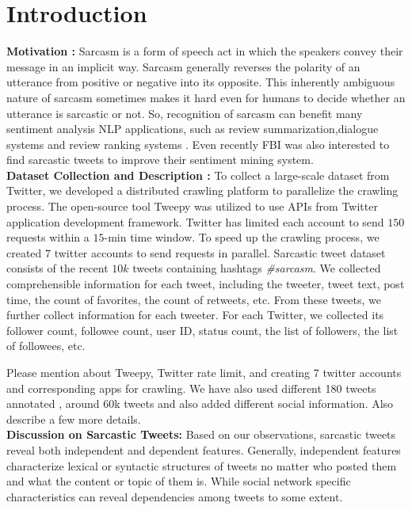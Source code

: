 \section{Introduction}

\noindent \textbf{Motivation :} Sarcasm is a form of speech act in which the speakers convey their message in an
implicit way. Sarcasm generally reverses the polarity of an utterance from positive or negative into its opposite. This inherently ambiguous nature of sarcasm sometimes makes it hard even for humans to decide whether an utterance is sarcastic or not. So, recognition of sarcasm can benefit many sentiment analysis NLP applications, such as review summarization,dialogue systems and review ranking systems \cite{Liu_survey}. Even recently FBI was also interested to find sarcastic tweets \cite{fbi_sarcasm} to improve their sentiment mining system.\\

\noindent \textbf{Dataset Collection and Description :} To collect a large-scale dataset from Twitter, we developed a distributed crawling platform to parallelize the crawling process. The open-source tool Tweepy was utilized to use APIs from Twitter application development framework. Twitter has limited each account to send $150$ requests within a $15$-min time window. To speed up the crawling process, we created $7$ twitter accounts to send requests in parallel. Sarcastic tweet dataset consists of the recent $10k$ tweets containing hashtags \emph{\#sarcasm}. We collected comprehensible information for each tweet, including the tweeter, tweet text, post time, the count of favorites, the count of retweets, etc. From these tweets, we further collect information for each tweeter. For each Twitter, we collected its follower count, followee count, user ID, status count, the list of followers, the list of followees, etc.
 
Please mention about Tweepy, Twitter rate limit, and creating 7 twitter accounts and corresponding apps for crawling. We have also used different 180 tweets annotated \cite{davidov10}, around 60k tweets \cite{tomas14} and also added different social information. Also describe a few more details.\\

\noindent \textbf{Discussion on Sarcastic Tweets: }Based on our observations, sarcastic tweets reveal both independent and dependent features. Generally, independent features characterize lexical or syntactic structures of tweets no matter who posted
them and what the content or topic of them is. While social network specific characteristics can reveal dependencies among tweets to some extent.

